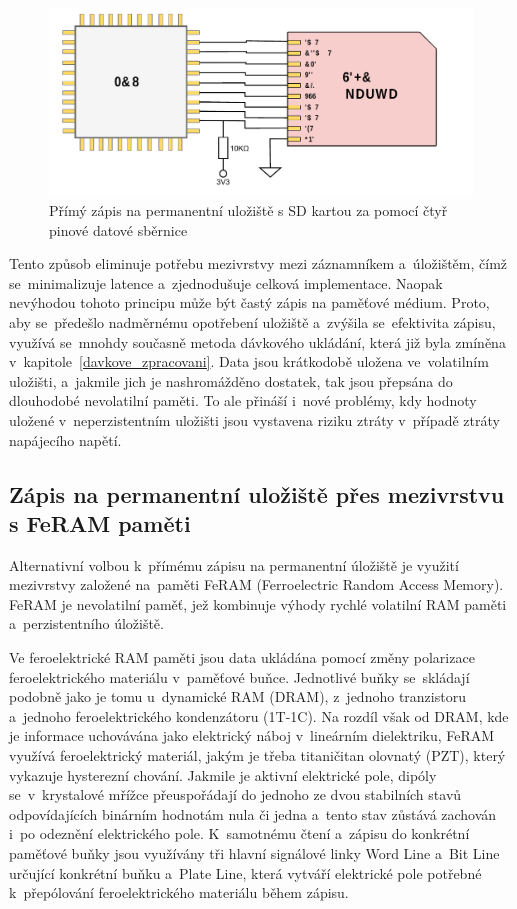 \begin{figure}[h]
    \centering
    \includegraphics[width=1.00\textwidth]{obrazky-figures/forward_write.pdf}
    
    \caption{Přímý zápis na permanentní uložiště s SD kartou za pomocí čtyř pinové datové sběrnice}
    \label{fig:forward-write}
\end{figure}

Tento způsob eliminuje potřebu mezivrstvy mezi záznamníkem a~úložištěm, čímž se~minimalizuje latence a~zjednodušuje celková implementace. Naopak nevýhodou tohoto principu může být častý zápis na paměťové médium. Proto, aby se~předešlo nadměrnému opotřebení uložiště a~zvýšila se~efektivita zápisu, využívá se~mnohdy současně metoda dávkového ukládání, která již byla zmíněna v~kapitole~\ref{davkove_zpracovani}. Data jsou krátkodobě uložena ve~volatilním uložišti, a~jakmile jich je nashromážděno dostatek, tak jsou přepsána do dlouhodobé nevolatilní paměti. To ale přináší i~nové problémy, kdy hodnoty uložené v~neperzistentním uložišti jsou vystavena riziku ztráty v~případě ztráty napájecího napětí.~\cite{ieee_digital_sound_recorder_arm_sd_card}

\subsection{Zápis na permanentní uložiště přes mezivrstvu s FeRAM paměti}
Alternativní volbou k~přímému zápisu na permanentní úložiště je využití mezivrstvy založené na~paměti FeRAM (Ferroelectric Random Access Memory). FeRAM je nevolatilní paměť, jež kombinuje výhody rychlé volatilní RAM paměti a~perzistentního úložiště.

Ve feroelektrické RAM paměti jsou data ukládána pomocí změny polarizace feroelektrického materiálu v~paměťové buňce. Jednotlivé buňky se~skládají podobně jako je tomu u~dynamické RAM (DRAM), z~jednoho tranzistoru a~jednoho feroelektrického kondenzátoru (1T-1C). Na rozdíl však od DRAM, kde je informace uchovávána jako elektrický náboj v~lineárním dielektriku, FeRAM využívá feroelektrický materiál, jakým je třeba titaničitan olovnatý (PZT), který vykazuje hysterezní chování. Jakmile je aktivní elektrické pole, dipóly se~v~krystalové mřížce přeuspořádají do jednoho ze dvou stabilních stavů odpovídajících binárním hodnotám nula či jedna a~tento stav zůstává zachován i~po odeznění elektrického pole. K~samotnému čtení a~zápisu do konkrétní paměťové buňky jsou využívány tři hlavní signálové linky Word Line a~Bit Line určující konkrétní buňku a~Plate Line, která vytváří elektrické pole potřebné k~přepólování feroelektrického materiálu během zápisu.~\cite{ieee_feram_ultra_high_density_embedded_mem}

